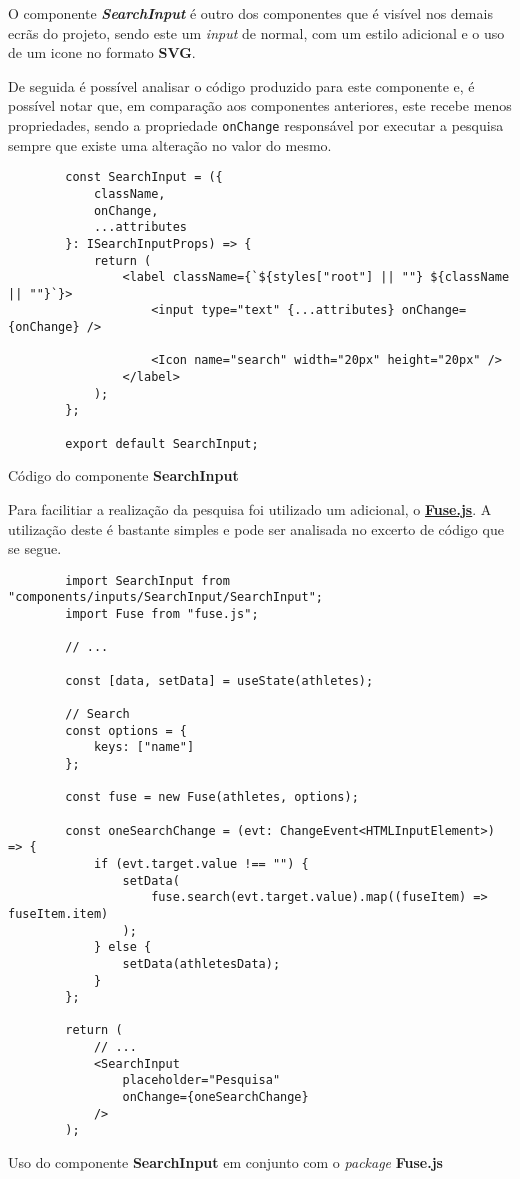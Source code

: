 

O componente \textbf{\textit{SearchInput}} é outro dos componentes que é visível nos demais ecrãs do projeto, sendo este um \textit{input} de \textbf{} normal, com um estilo adicional e o uso de um icone no formato \textbf{SVG}.

De seguida é possível analisar o código produzido para este componente e, é possível notar que, em comparação aos componentes anteriores, este recebe menos propriedades, sendo a propriedade \texttt{onChange} responsável por executar a pesquisa sempre que existe uma alteração no valor do mesmo.

\begin{longlisting}
	\begin{verbatim}
		const SearchInput = ({
			className,
			onChange,
			...attributes
		}: ISearchInputProps) => {
			return (
				<label className={`${styles["root"] || ""} ${className || ""}`}>
					<input type="text" {...attributes} onChange={onChange} />

					<Icon name="search" width="20px" height="20px" />
				</label>
			);
		};

		export default SearchInput;
	\end{verbatim}
	\caption{Código do componente \textbf{SearchInput}}
\end{longlisting}

Para facilitiar a realização da pesquisa foi utilizado um \textit{} adicional, o \textbf{\href{https://fusejs.io/}{Fuse.js}}. A utilização deste \textit{} é bastante simples e pode ser analisada no excerto de código que se segue.

\begin{longlisting}
	\begin{verbatim}
		import SearchInput from "components/inputs/SearchInput/SearchInput";
		import Fuse from "fuse.js";

		// ...

		const [data, setData] = useState(athletes);

		// Search
		const options = {
			keys: ["name"]
		};

		const fuse = new Fuse(athletes, options);

		const oneSearchChange = (evt: ChangeEvent<HTMLInputElement>) => {
			if (evt.target.value !== "") {
				setData(
					fuse.search(evt.target.value).map((fuseItem) => fuseItem.item)
				);
			} else {
				setData(athletesData);
			}
		};

		return (
			// ...
			<SearchInput
				placeholder="Pesquisa"
				onChange={oneSearchChange}
			/>
		);
	\end{verbatim}

	\caption{Uso do componente \textbf{SearchInput} em conjunto com o \textit{package} \textbf{Fuse.js}}
\end{longlisting}

